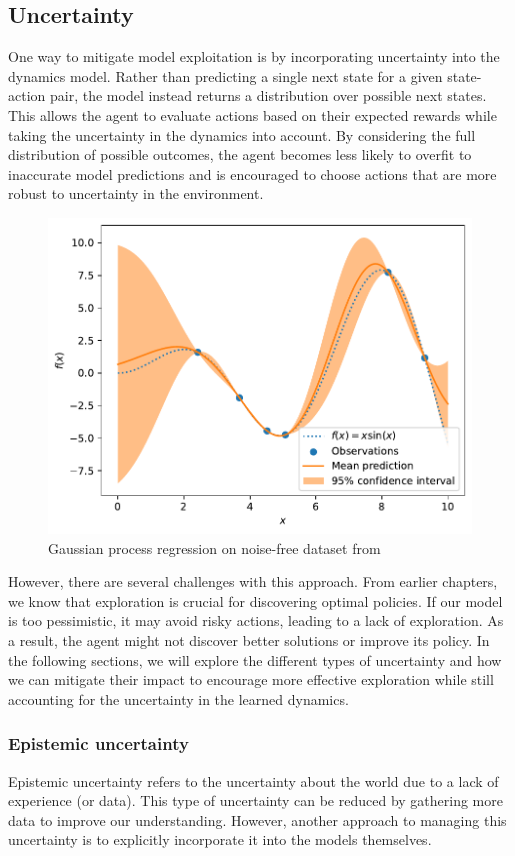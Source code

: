 \subsection{Uncertainty}
One way to mitigate model exploitation is by incorporating uncertainty into the dynamics model. Rather than predicting a single 
next state for a given state-action pair, the model instead returns a distribution over possible next states. This allows the 
agent to evaluate actions based on their expected rewards while taking the uncertainty in the dynamics into account. By 
considering the full distribution of possible outcomes, the agent becomes less likely to overfit to inaccurate model predictions 
and is encouraged to choose actions that are more robust to uncertainty in the environment.
\begin{figure}[H]
    \centering
    \includegraphics[width=0.7\linewidth]{images/gp_visual.pdf}
    \caption{ Gaussian process regression on noise-free dataset from \cite{GP}}
    \label{uncert_plot}
\end{figure}
However, there are several challenges with this approach. From earlier chapters, we know 
that exploration is crucial for discovering optimal policies. If our model is too 
pessimistic, it may avoid risky actions, leading to a lack of exploration. As a result, 
the agent might not discover better solutions or improve its policy. In the following 
sections, we will explore the different types of uncertainty and how we can mitigate their 
impact to encourage more effective exploration while still accounting for the uncertainty 
in the learned dynamics.

\subsubsection{Epistemic uncertainty}
Epistemic uncertainty refers to the uncertainty about the world due to a lack of 
experience (or data). This type of uncertainty can be reduced by gathering more data to 
improve our understanding. However, another approach to managing this uncertainty is to 
explicitly incorporate it into the models themselves.

